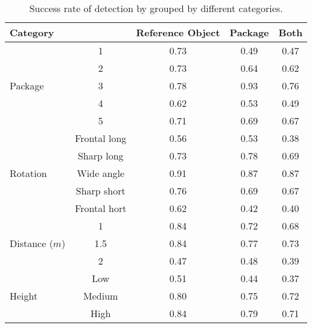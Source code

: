 \begin{table}%
\centering
\begin{tabular}{lcccc}
\toprule
\multicolumn{2}{l}{Category} & Reference Object & Package & Both\\
\midrule

\multirow{5}{*}{Package} 
& 1 & 0.73 & 0.49 & 0.47 \\ 
& 2 & 0.73 & 0.64 & 0.62 \\
& 3 & 0.78 & 0.93 & 0.76 \\
& 4 & 0.62 & 0.53 & 0.49 \\
& 5 & 0.71 & 0.69 & 0.67 \\
\midrule

\multirow{5}{*}{Rotation}
& Frontal long		& 0.56 & 0.53 & 0.38 \\ 
& Sharp long		& 0.73 & 0.78 & 0.69 \\
& Wide angle 		& 0.91 & 0.87 & 0.87 \\
& Sharp short 		& 0.76 & 0.69 & 0.67 \\
& Frontal hort		& 0.62 & 0.42 & 0.40 \\
\midrule
\multirow{3}{*}{Distance ($m$)} 
& 1 			& 0.84 & 0.72 & 0.68 \\ 
& 1.5  			& 0.84 & 0.77 & 0.73 \\
& 2 			& 0.47 & 0.48 & 0.39 \\
\midrule
\multirow{3}{*}{Height} 
& Low 		& 0.51 & 0.44 & 0.37 \\ 
& Medium 	& 0.80 & 0.75 & 0.72 \\
& High		& 0.84 & 0.79 & 0.71 \\
\bottomrule
 \end{tabular}
 \caption{Success rate of detection by grouped by different categories.}
\label{table:detection_categories}
\end{table}
